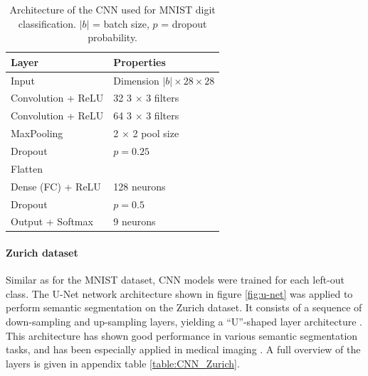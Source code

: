 \documentclass[10pt]{article}
\begin{document}
\begin{table}[H]
    \begin{center}
    \begin{tabular}{ll}
    \toprule
    Layer & Properties \\
    \hline
    Input & Dimension $|b| \times 28 \times 28$ \\ 
    Convolution + \gls{ReLU} & 32 3 $\times$ 3 filters\\
    Convolution + \gls{ReLU} & 64 3 $\times$ 3 filters\\
    MaxPooling & 2 $\times$ 2 pool size \\
    Dropout & $p = 0.25$ \\
    \hline
    Flatten & \\
    Dense (\gls{FC}) + \gls{ReLU} & 128 neurons\\
    Dropout & $p = 0.5$ \\
    Output + Softmax & 9 neurons \\
    \bottomrule
    \end{tabular}
    \caption{Architecture of the \gls{CNN} used for MNIST digit classification. $|b|$ = batch size, $p$ = dropout probability.}
    \label{table:CNN_MNIST}
    \end{center}
\end{table}

\paragraph{Zurich dataset} Similar as for the MNIST dataset, \gls{CNN} models were trained for each left-out class. The U-Net network architecture shown in figure \ref{fig:u-net} was applied to perform semantic segmentation on the Zurich dataset. It consists of a sequence of down-sampling and up-sampling layers, yielding a ``U''-shaped layer architecture \cite{ronneberger2015u}. This architecture has shown good performance in various semantic segmentation tasks, and has been especially applied in medical imaging \cite{ronneberger2015u, Alom2018RecurrentRC, Dong2017AutomaticBT}. A full overview of the layers is given in appendix table  \ref{table:CNN_Zurich}.
\end{document}
